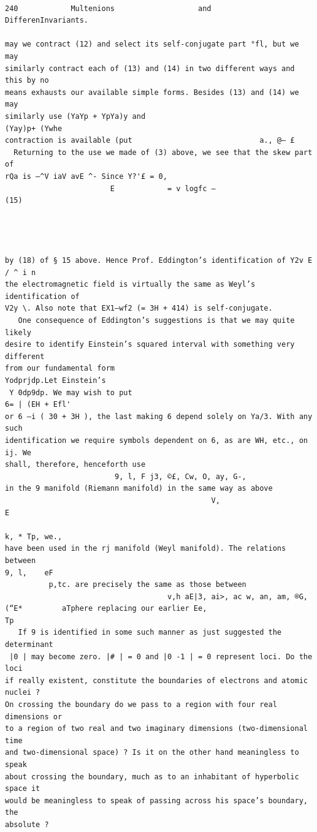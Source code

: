 \documentclass[10pt]{article}
\begin{document}
\clearpage
\begin{verbatim}

240            Multenions                   and           DifferenInvariants.

may we contract (12) and select its self-conjugate part °fl, but we may
similarly contract each of (13) and (14) in two different ways and this by no
means exhausts our available simple forms. Besides (13) and (14) we may
similarly use (YaYp + YpYa)y and                                      (Yay)p+ (Ywhe
contraction is available (put                             a., @— £
  Returning to the use we made of (3) above, we see that the skew part of
rQa is —^V iaV avE ^- Since Y?'£ = 0,
                        E            = v logfc —                              (15)




by (18) of § 15 above. Hence Prof. Eddington’s identification of Y2v E / ^ i n
the electromagnetic field is virtually the same as Weyl’s identification of
V2y \. Also note that EX1—wf2 (= 3H + 414) is self-conjugate.
   One consequence of Eddington’s suggestions is that we may quite likely
desire to identify Einstein’s squared interval with something very different
from our fundamental form                                    Yodprjdp.Let Einstein’s
 Y 0dp9dp. We may wish to put                                        6= | (EH + Efl'
or 6 —i ( 30 + 3H ), the last making 6 depend solely on Ya/3. With any such
identification we require symbols dependent on 6, as are WH, etc., on ij. We
shall, therefore, henceforth use
                         9, l, F j3, ©£, Cw, O, ay, G-,
in the 9 manifold (Riemann manifold) in the same way as above
                                               V,                       E
                                                                        k, * Tp, we.,
have been used in the rj manifold (Weyl manifold). The relations between
9, l,    eF
          p,tc. are precisely the same as those between
                                     v,h aE|3, ai>, ac w, an, am, ®G,
(“E*         aTphere replacing our earlier Ee,                                 Tp
   If 9 is identified in some such manner as just suggested the determinant
 |0 | may become zero. |# | = 0 and |0 -1 | = 0 represent loci. Do the loci
if really existent, constitute the boundaries of electrons and atomic nuclei ?
On crossing the boundary do we pass to a region with four real dimensions or
to a region of two real and two imaginary dimensions (two-dimensional time
and two-dimensional space) ? Is it on the other hand meaningless to speak
about crossing the boundary, much as to an inhabitant of hyperbolic space it
would be meaningless to speak of passing across his space’s boundary, the
absolute ?

\end{verbatim}
\end{document}
